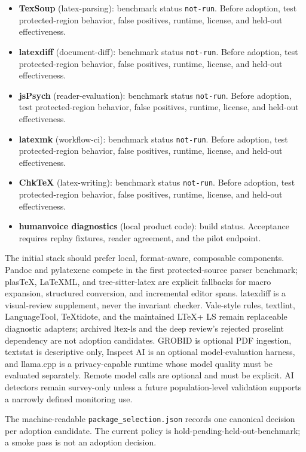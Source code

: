 \documentclass[11pt]{article}
\begin{document}
\begin{itemize}
\item
  \textbf{TexSoup} (latex-parsing): benchmark status \texttt{not-run}. Before adoption, test protected-region behavior, false positives, runtime, license, and held-out effectiveness.
\item
  \textbf{latexdiff} (document-diff): benchmark status \texttt{not-run}. Before adoption, test protected-region behavior, false positives, runtime, license, and held-out effectiveness.
\item
  \textbf{jsPsych} (reader-evaluation): benchmark status \texttt{not-run}. Before adoption, test protected-region behavior, false positives, runtime, license, and held-out effectiveness.
\item
  \textbf{latexmk} (workflow-ci): benchmark status \texttt{not-run}. Before adoption, test protected-region behavior, false positives, runtime, license, and held-out effectiveness.
\item
  \textbf{ChkTeX} (latex-writing): benchmark status \texttt{not-run}. Before adoption, test protected-region behavior, false positives, runtime, license, and held-out effectiveness.
\item
  \textbf{humanvoice diagnostics} (local product code): build status. Acceptance requires replay fixtures, reader agreement, and the pilot endpoint.
\end{itemize}

The initial stack should prefer local, format-aware, composable components. Pandoc and pylatexenc compete in the first protected-source parser benchmark; plasTeX, LaTeXML, and tree-sitter-latex are explicit fallbacks for macro expansion, structured conversion, and incremental editor spans. latexdiff is a visual-review supplement, never the invariant checker. Vale-style rules, textlint, LanguageTool, TeXtidote, and the maintained LTeX+ LS remain replaceable diagnostic adapters; archived ltex-ls and the deep review's rejected proselint dependency are not adoption candidates. GROBID is optional PDF ingestion, textstat is descriptive only, Inspect AI is an optional model-evaluation harness, and llama.cpp is a privacy-capable runtime whose model quality must be evaluated separately. Remote model calls are optional and must be explicit. AI detectors remain survey-only unless a future population-level validation supports a narrowly defined monitoring use.

The machine-readable \texttt{package\_selection.json} records one canonical decision per adoption candidate. The current policy is hold-pending-held-out-benchmark; a smoke pass is not an adoption decision.
\end{document}
